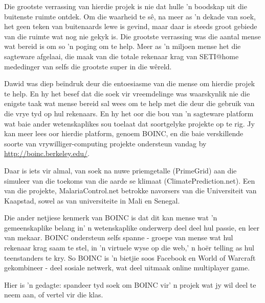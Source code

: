Die grootste verrassing van hierdie projek is nie dat hulle 'n boodskap uit die buitenste ruimte ontdek. Om die waarheid te sê, na meer as 'n dekade van soek, het geen teken van buitenaards lewe is gevind, maar daar is steeds groot gebiede van die ruimte wat nog nie gekyk is. Die grootste verrassing was die aantal mense wat bereid is om so 'n poging om te help. Meer as 'n miljoen mense het die sagteware afgelaai, die maak van die totale rekenaar krag van SETI@home mededinger van selfs die grootste super in die wêreld. \par
Dawid was diep beïndruk deur die entoesiasme van die mense om hierdie projek te help. En hy het besef dat die soek vir vreemdelinge was waarskynlik nie die enigste taak wat mense bereid sal wees om te help met die deur die gebruik van die vrye tyd op hul rekenaars. En hy het oor die bou van 'n sagteware platform wat baie ander wetenskaplikes sou toelaat dat soortgelyke projekte op te rig. Jy kan meer lees oor hierdie platform, genoem BOINC, en die baie verskillende soorte van vrywilliger-computing projekte ondersteun vandag by \underline{http://boinc.berkeley.edu/}. \par 
Daar is iets vir almal, van soek na nuwe priemgetalle (PrimeGrid) aan die simuleer van die toekoms van die aarde se klimaat (ClimatePrediction.net). Een van die projekte, MalariaControl.net betrokke navorsers van die Universiteit van Kaapstad, sowel as van universiteite in Mali en Senegal. \par

Die ander netjiese kenmerk van BOINC is dat dit kan mense wat 'n gemeenskaplike belang in' n wetenskaplike onderwerp deel deel hul passie, en leer van mekaar. BOINC ondersteun selfs spanne - groepe van mense wat hul rekenaar krag saam te stel, in 'n virtuele wyse op die web,' n hoër telling as hul teenstanders te kry. So BOINC is 'n bietjie soos Facebook en World of Warcraft gekombineer - deel sosiale netwerk, wat deel uitmaak online multiplayer game. \par
Hier is 'n gedagte: spandeer tyd soek om BOINC vir' n projek wat jy wil deel te neem aan, of vertel vir die klas. 


